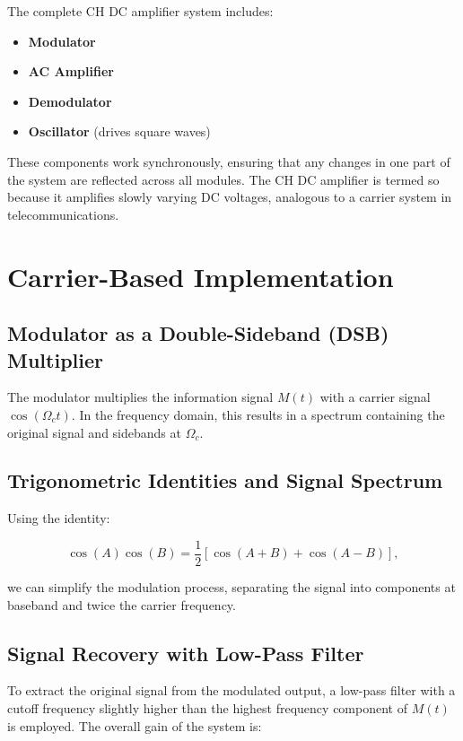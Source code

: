 The complete CH DC amplifier system includes:
\begin{itemize}
    \item \textbf{Modulator}
    \item \textbf{AC Amplifier}
    \item \textbf{Demodulator}
    \item \textbf{Oscillator} (drives square waves)
\end{itemize}

These components work synchronously, ensuring that any changes in one part of the system are reflected across all modules. The CH DC amplifier is termed so because it amplifies slowly varying DC voltages, analogous to a carrier system in telecommunications.

\section{Carrier-Based Implementation}

\subsection{Modulator as a Double-Sideband (DSB) Multiplier}

The modulator multiplies the information signal \( M(t) \) with a carrier signal \( \cos(\Omega_c t) \). In the frequency domain, this results in a spectrum containing the original signal and sidebands at \( \Omega_c \).

\subsection{Trigonometric Identities and Signal Spectrum}

Using the identity:

\[
\cos(A) \cos(B) = \frac{1}{2} \left[ \cos(A+B) + \cos(A-B) \right],
\]

we can simplify the modulation process, separating the signal into components at baseband and twice the carrier frequency.

\subsection{Signal Recovery with Low-Pass Filter}

To extract the original signal from the modulated output, a low-pass filter with a cutoff frequency slightly higher than the highest frequency component of \( M(t) \) is employed. The overall gain of the system is:


